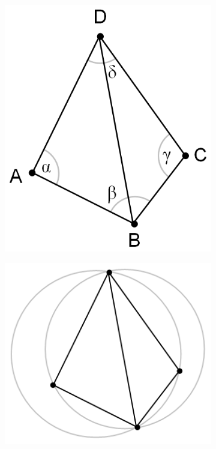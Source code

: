 \begin{figure}[H]
    \centering
    \caption{Regra do circuncírculo que define se um triângulo é ou não de Delaynay.}
    \begin{subfigure}[t]{0.2\textwidth}
        \includegraphics[width=\textwidth]{dados/figuras/delaunay_theorem1.png}
        \caption{}
        \label{fig:delaunay_theorem1}
    \end{subfigure}
    \hspace{2em}
    \begin{subfigure}[t]{0.27\textwidth}
        \includegraphics[width=\textwidth]{dados/figuras/delaunay_theorem2.png}

\end{subfigure}
\end{figure}
